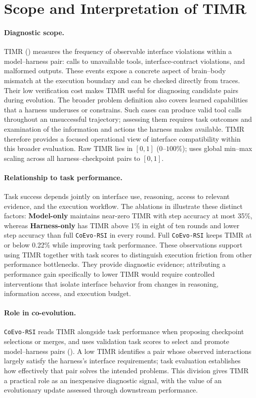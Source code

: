 \documentclass[11pt,a4paper]{article}
\newcommand{\ourmethod}{\texttt{CoEvo-RSI}}
\begin{document}
\raggedbottom
\section{Scope and Interpretation of TIMR}
\label{app:timr}

\paragraph{Diagnostic scope.}
TIMR () measures the frequency of observable interface violations within a model--harness pair: calls to unavailable tools, interface-contract violations, and malformed outputs. These events expose a concrete aspect of brain--body mismatch at the execution boundary and can be checked directly from traces. Their low verification cost makes TIMR useful for diagnosing candidate pairs during evolution. The broader problem definition also covers learned capabilities that a harness underuses or constrains. Such cases can produce valid tool calls throughout an unsuccessful trajectory; assessing them requires task outcomes and examination of the information and actions the harness makes available. TIMR therefore provides a focused operational view of interface compatibility within this broader evaluation. Raw TIMR lies in $[0,1]$ ($0$--$100\%$);  uses global min--max scaling across all harness--checkpoint pairs to $[0,1]$.

\paragraph{Relationship to task performance.}
Task success depends jointly on interface use, reasoning, access to relevant evidence, and the execution workflow. The ablations in  illustrate these distinct factors: \textbf{Model-only} maintains near-zero TIMR with step accuracy at most 35\%, whereas \textbf{Harness-only} has TIMR above 1\% in eight of ten rounds and lower step accuracy than full \ourmethod{} in every round. Full \ourmethod{} keeps TIMR at or below 0.22\% while improving task performance. These observations support using TIMR together with task scores to distinguish execution friction from other performance bottlenecks. They provide diagnostic evidence; attributing a performance gain specifically to lower TIMR would require controlled interventions that isolate interface behavior from changes in reasoning, information access, and execution budget.

\paragraph{Role in co-evolution.}
\ourmethod{} reads TIMR alongside task performance when proposing checkpoint selections or merges, and uses validation task scores to select and promote model--harness pairs (). A low TIMR identifies a pair whose observed interactions largely satisfy the harness's interface requirements; task evaluation establishes how effectively that pair solves the intended problems. This division gives TIMR a practical role as an inexpensive diagnostic signal, with the value of an evolutionary update assessed through downstream performance.
\end{document}
